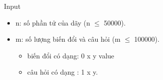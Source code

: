 Input
\begin{itemize}
	\item n: số phần tử của dãy (n  $\le$  50000).
	\item m: số lượng biến đổi và câu hỏi (m  $\le$  100000).
\begin{itemize}
	\item biến đổi có dạng: 0 x y value
	\item câu hỏi có dạng : 1 x y.
\end{itemize}
\end{itemize}